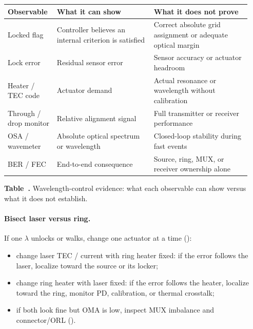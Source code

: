 \begin{table}[ht]
\label{tab:lock-evidence}%
\centering
\setlength{\tabcolsep}{3pt}%
\footnotesize
\renewcommand{\arraystretch}{1.25}%
\begin{tabular}{@{}p{0.18\linewidth}p{0.38\linewidth}p{0.38\linewidth}@{}}
\toprule
Observable & What it can show & What it does not prove \\
\midrule
Locked flag & Controller believes an internal criterion is satisfied & Correct absolute grid assignment or adequate optical margin \\
\addlinespace[1.0em]
Lock error & Residual sensor error & Sensor accuracy or actuator headroom \\
\addlinespace[1.0em]
Heater / TEC code & Actuator demand & Actual resonance or wavelength without calibration \\
\addlinespace[1.0em]
Through / drop monitor & Relative alignment signal & Full transmitter or receiver performance \\
\addlinespace[1.0em]
OSA / wavemeter & Absolute optical spectrum or wavelength & Closed-loop stability during fast events \\
\addlinespace[1.0em]
BER / FEC & End-to-end consequence & Source, ring, MUX, or receiver ownership alone \\
\bottomrule
\end{tabular}
\par\medskip
{\raggedright\footnotesize\textbf{Table~\thetable.} Wavelength-control evidence:
what each observable can show versus what it does not establish.\par}
\end{table}

\paragraph{Bisect laser versus ring.}
If one $\lambda$ unlocks or walks, change one actuator at a time
():
\begin{itemize}
\item change laser TEC / current with ring heater fixed: if the error follows the
      laser, localize toward the source or its locker;
\item change ring heater with laser fixed: if the error follows the heater,
      localize toward the ring, monitor PD, calibration, or thermal crosstalk;
\item if both look fine but OMA is low, inspect MUX imbalance and connector/ORL
      ().
\end{itemize}

